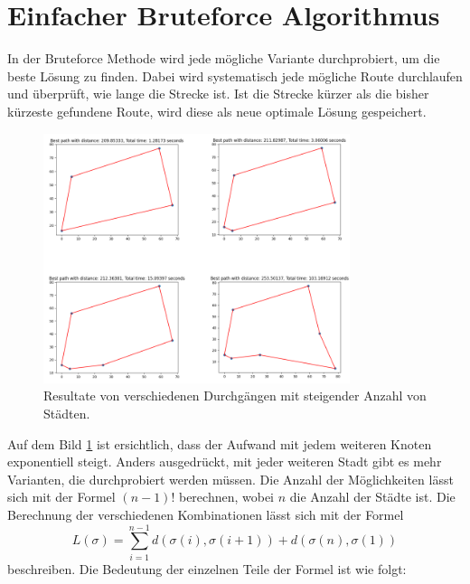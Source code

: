 %
%
%
%
\section{Einfacher Bruteforce Algorithmus
  \label{buch:paper:varalg:section:bruteforce}}
In der Bruteforce Methode wird jede mögliche Variante durchprobiert,
um die beste Lösung zu finden. Dabei wird systematisch jede mögliche
Route durchlaufen und überprüft, wie lange die Strecke ist.
Ist die Strecke kürzer als die bisher kürzeste gefundene Route,
wird diese als neue optimale Lösung gespeichert.
\begin{figure}
    \centering
    \includegraphics[width=0.8\textwidth]{papers/varalg/images/teil2/02BruteforceMethode.png}
    \caption{Resultate von verschiedenen Durchgängen mit steigender Anzahl von Städten.
        \label{fig:results_bruteforce}}
\end{figure}
Auf dem Bild \ref{fig:results_bruteforce} ist ersichtlich, dass der
Aufwand mit jedem weiteren Knoten exponentiell steigt. Anders
ausgedrückt, mit jeder weiteren Stadt gibt es mehr Varianten, die
durchprobiert werden müssen. Die Anzahl der Möglichkeiten lässt sich
mit der Formel \((n-1)!\) berechnen, wobei \(n\) die Anzahl der Städte ist.
Die Berechnung der verschiedenen Kombinationen lässt sich mit der
Formel
\begin{equation}
    L(\sigma)
    =
    \sum_{i=1}^{n-1} d(\sigma(i), \sigma(i+1)) + d(\sigma(n), \sigma(1))
    \label{eq:bruteforce_min_formula}
\end{equation}
beschreiben. Die Bedeutung der einzelnen Teile der Formel ist wie folgt:
